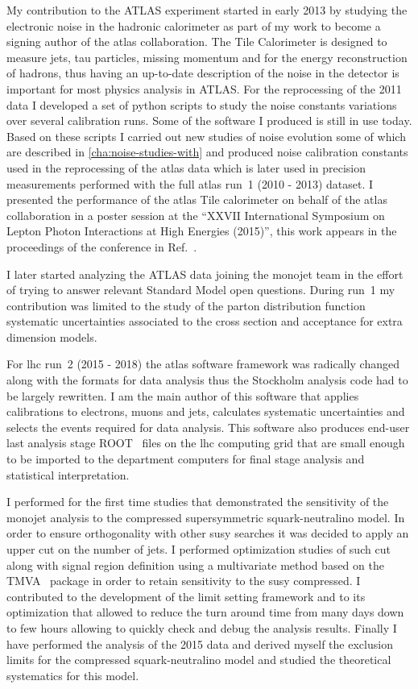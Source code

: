 My contribution to the ATLAS experiment started in early 2013 by studying the
electronic noise in the hadronic calorimeter as part of my work to become a
signing author of the \gls{atlas} collaboration. The Tile Calorimeter is
designed to measure jets, tau particles, missing momentum and for the energy
reconstruction of hadrons, thus having an up-to-date description of the noise in
the detector is important for most physics analysis in ATLAS\@. For the
reprocessing of the 2011 data I developed a set of python scripts to study the
noise constants variations over several calibration runs. Some of the software I
produced is still in use today. Based on these scripts I carried out new studies
of noise evolution some of which are described in \cref{cha:noise-studies-with}
and produced noise calibration constants used in the reprocessing of the
\gls{atlas} data which is later used in precision measurements performed with
the full \gls{atlas} run~1 (2010 - 2013) dataset. I presented the performance of
the \gls{atlas} Tile calorimeter on behalf of the \gls{atlas} collaboration in a
poster session at the ``XXVII International Symposium on Lepton Photon
Interactions at High Energies (2015)'', this work appears in the proceedings of
the conference in Ref.~\cite{TileCalPerformanceBertoli}.

I later started analyzing the ATLAS data joining the monojet team in the effort
of trying to answer relevant Standard Model open questions. During run~1 my
contribution was limited to the study of the parton distribution function
systematic uncertainties associated to the cross section and acceptance for
extra dimension models.

For \gls{lhc} run~2 (2015 - 2018) the \gls{atlas} software framework was
radically changed along with the formats for data analysis thus the Stockholm
analysis code had to be largely rewritten. I am the main author of this software
that applies calibrations to electrons, muons and jets, calculates systematic
uncertainties and selects the events required for data analysis. This software
also produces end-user last analysis stage ROOT~\cite{CERNROOT} files on the
\gls{lhc} computing grid that are small enough to be imported to the department
computers for final stage analysis and statistical interpretation.

I performed for the first time studies that demonstrated the sensitivity of the
monojet analysis to the compressed supersymmetric squark-neutralino model. In
order to ensure orthogonality with other \gls{susy} searches it was decided to
apply an upper cut on the number of jets. I performed optimization studies of
such cut along with signal region definition using a multivariate method based
on the TMVA~\cite{TMVA} package in order to retain sensitivity to the \gls{susy}
compressed. I contributed to the development of the limit setting framework and
to its optimization that allowed to reduce the turn around time from many days
down to few hours allowing to quickly check and debug the analysis
results. Finally I have performed the analysis of the 2015 data and derived
myself the exclusion limits for the compressed squark-neutralino model and
studied the theoretical systematics for this model.

